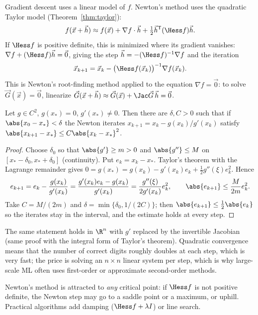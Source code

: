Gradient descent uses a linear model of $f$. Newton's method uses the quadratic Taylor model (Theorem~\ref{thm:taylor}):
\[
f(\vec x+\vec h)\approx f(\vec x)+\nabla f\cdot\vec h+\tfrac12\vec h^{\mathsf T}(\Hess f)\vec h .
\]
If $\Hess f$ is positive definite, this is minimized where its gradient vanishes: $\nabla f+(\Hess f)\vec h=\vec0$, giving the step $\vec h=-(\Hess f)^{-1}\nabla f$ and the iteration
\[
\vec x_{k+1}=\vec x_k-\bigl(\Hess f(\vec x_k)\bigr)^{-1}\nabla f(\vec x_k).
\]
This is Newton's root-finding method applied to the equation $\nabla f=\vec0$: to solve $\vec G(\vec x)=\vec0$, linearize $\vec G(\vec x+\vec h)\approx\vec G(\vec x)+\Jac\vec G\,\vec h=\vec0$.

\begin{theorem}\label{thm:newton}
Let $g\in C^2$, $g(x_*)=0$, $g'(x_*)\ne0$. Then there are $\delta,C>0$ such that if $\abs{x_0-x_*}<\delta$ the Newton iterates $x_{k+1}=x_k-g(x_k)/g'(x_k)$ satisfy $\abs{x_{k+1}-x_*}\le C\abs{x_k-x_*}^2$.
\end{theorem}

\begin{proof}
Choose $\delta_0$ so that $\abs{g'}\ge m>0$ and $\abs{g''}\le M$ on $[x_*-\delta_0,x_*+\delta_0]$ (continuity). Put $e_k=x_k-x_*$. Taylor's theorem with the Lagrange remainder gives $0=g(x_*)=g(x_k)-g'(x_k)e_k+\frac12g''(\xi)e_k^2$. Hence
\[
e_{k+1}=e_k-\frac{g(x_k)}{g'(x_k)}=\frac{g'(x_k)e_k-g(x_k)}{g'(x_k)}=\frac{g''(\xi)}{2g'(x_k)}e_k^2,\qquad\abs{e_{k+1}}\le\frac M{2m}e_k^2 .
\]
Take $C=M/(2m)$ and $\delta=\min\{\delta_0,1/(2C)\}$; then $\abs{e_{k+1}}\le\frac12\abs{e_k}$ so the iterates stay in the interval, and the estimate holds at every step.
\end{proof}

The same statement holds in $\R^n$ with $g'$ replaced by the invertible Jacobian (same proof with the integral form of Taylor's theorem). Quadratic convergence means that the number of correct digits roughly doubles at each step, which is very fast; the price is solving an $n\times n$ linear system per step, which is why large-scale ML often uses first-order or approximate second-order methods.

\begin{pitfall}
Newton's method is attracted to \emph{any} critical point: if $\Hess f$ is not positive definite, the Newton step may go to a saddle point or a maximum, or uphill. Practical algorithms add damping ($\Hess f+\lambda I$) or line search.
\end{pitfall}


